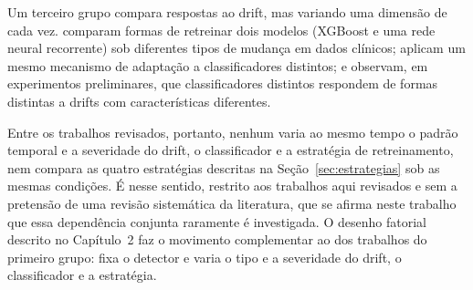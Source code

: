 Um terceiro grupo compara respostas ao drift, mas variando uma dimensão de
cada vez.  comparam formas de retreinar dois modelos
(XGBoost e uma rede neural recorrente) sob diferentes tipos de mudança em
dados clínicos;
 aplicam um mesmo mecanismo de adaptação a
classificadores distintos; e  observam, em experimentos
preliminares, que classificadores distintos respondem de formas distintas a
drifts com características diferentes.

Entre os trabalhos revisados, portanto, nenhum varia ao mesmo tempo o padrão
temporal e a severidade do drift, o classificador e a estratégia de
retreinamento, nem compara as quatro estratégias descritas na
Seção~\ref{sec:estrategias} sob as mesmas condições. É nesse sentido,
restrito aos trabalhos aqui revisados e sem a pretensão de uma revisão
sistemática da literatura, que se afirma neste trabalho que essa dependência
conjunta raramente é investigada. O desenho fatorial descrito no
Capítulo~2 faz o movimento complementar ao dos trabalhos do primeiro grupo:
fixa o detector e varia o tipo e a severidade do drift, o classificador e a
estratégia.
